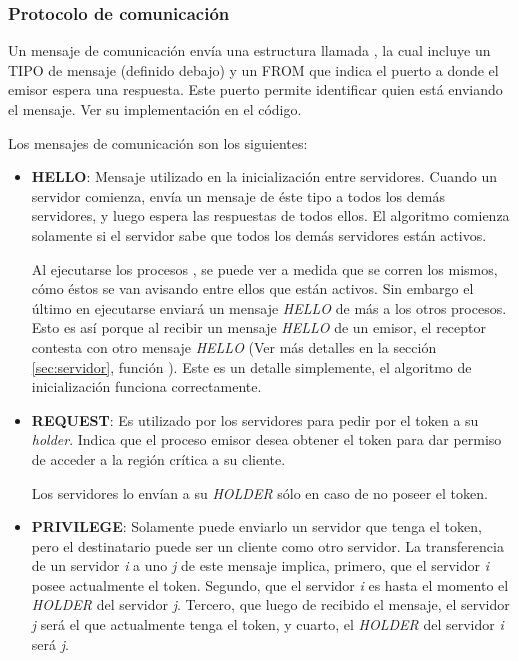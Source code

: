 \subsubsection{Protocolo de comunicación}

Un mensaje de comunicación envía una estructura llamada , la cual
incluye un TIPO de mensaje (definido debajo) y un FROM que indica el puerto a
donde el emisor espera una respuesta. Este puerto permite identificar quien está
enviando el mensaje. Ver su implementación en el código.

Los mensajes de comunicación son los siguientes:

\begin{itemize}

\item \textbf{HELLO}: Mensaje utilizado en la inicialización entre servidores.
Cuando un servidor comienza, envía un mensaje de éste tipo a todos los demás
servidores, y luego espera las respuestas de todos ellos. El algoritmo comienza
solamente si el servidor sabe que todos los demás servidores están activos.

Al ejecutarse los procesos , se puede ver a medida que se
corren los mismos, cómo éstos se van avisando entre ellos que están activos.
Sin embargo el último en ejecutarse enviará un mensaje \emph{HELLO} de más a
los otros procesos. Esto es así porque al recibir un mensaje \emph{HELLO} de un
emisor, el receptor contesta con otro mensaje \emph{HELLO} (Ver más detalles en
la sección \ref{sec:servidor}, función ). Este es un
detalle simplemente, el algoritmo de inicialización funciona correctamente.

\item \textbf{REQUEST}: Es utilizado por los servidores para pedir por el token
a su \emph{holder}. Indica que el proceso  emisor desea obtener
el token para dar permiso de acceder a la región crítica a su cliente.

Los servidores lo envían a su \emph{HOLDER} sólo en caso de no poseer el token.

\item \textbf{PRIVILEGE}: Solamente puede enviarlo un servidor que tenga el
token, pero el destinatario puede ser un cliente como otro servidor. La
transferencia de un servidor \textsl{i} a uno \textsl{j} de este mensaje
implica, primero, que el servidor \textsl{i} posee actualmente el token.
Segundo, que el servidor \textsl{i} es hasta el momento el \emph{HOLDER} del
servidor \textsl{j}. Tercero, que luego de recibido el mensaje, el servidor
\textsl{j} será el que actualmente tenga el token, y cuarto, el \emph{HOLDER}
del servidor \textsl{i} será \textsl{j}.


\end{itemize}
